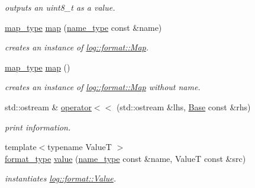 \begin{DoxyCompactItemize}
\begin{DoxyCompactList}\small\item\em outputs an uint8\-\_\-t as a value. \end{DoxyCompactList}\item 
\hyperlink{namespacehryky_1_1log_1_1format_aca5654dc79f5b065700e17790f2aa701}{map\-\_\-type} \hyperlink{namespacehryky_1_1log_1_1format_ab2b4123702f3dd9467a1d4db34d8d36b}{map} (\hyperlink{namespacehryky_1_1log_1_1format_ab7408d1e2ed2d648dbf9bba69eb74288}{name\-\_\-type} const \&name)
\begin{DoxyCompactList}\small\item\em creates an instance of \hyperlink{classhryky_1_1log_1_1format_1_1_map}{log\-::format\-::\-Map}. \end{DoxyCompactList}\item 
\hyperlink{namespacehryky_1_1log_1_1format_aca5654dc79f5b065700e17790f2aa701}{map\-\_\-type} \hyperlink{namespacehryky_1_1log_1_1format_ab082eda860c437408b7dbf88cb47529b}{map} ()
\begin{DoxyCompactList}\small\item\em creates an instance of \hyperlink{classhryky_1_1log_1_1format_1_1_map}{log\-::format\-::\-Map} without name. \end{DoxyCompactList}\item 
\hypertarget{namespacehryky_1_1log_1_1format_ad214f866f3f6ebc919c87f9f03132f17}{std\-::ostream \& \hyperlink{namespacehryky_1_1log_1_1format_ad214f866f3f6ebc919c87f9f03132f17}{operator$<$$<$} (std\-::ostream \&lhs, \hyperlink{classhryky_1_1log_1_1format_1_1_base}{Base} const \&rhs)}\label{namespacehryky_1_1log_1_1format_ad214f866f3f6ebc919c87f9f03132f17}

\begin{DoxyCompactList}\small\item\em print information. \end{DoxyCompactList}\item 
{\footnotesize template$<$typename Value\-T $>$ }\\\hyperlink{namespacehryky_1_1log_ad50448c3f934f1eacd5c1bcffe8111e1}{format\-\_\-type} \hyperlink{namespacehryky_1_1log_1_1format_a5b9af9c1a7b018d54144acfb1b8cc960}{value} (\hyperlink{namespacehryky_1_1log_1_1format_ab7408d1e2ed2d648dbf9bba69eb74288}{name\-\_\-type} const \&name, Value\-T const \&src)
\begin{DoxyCompactList}\small\item\em instantiates \hyperlink{classhryky_1_1log_1_1format_1_1_value}{log\-::format\-::\-Value}. \end{DoxyCompactList}\end{DoxyCompactItemize}



